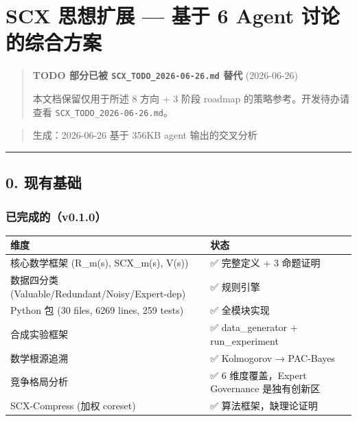 \documentclass[
  12pt,
]{ctexart}
\author{SCX}
\date{2026}
\begin{document}
\section{SCX 思想扩展 --- 基于 6 Agent
讨论的综合方案}\label{scx-ux601dux60f3ux6269ux5c55-ux57faux4e8e-6-agent-ux8ba8ux8bbaux7684ux7efcux5408ux65b9ux6848}

\begin{quote}
\textbf{TODO 部分已被 \texttt{SCX\_TODO\_2026-06-26.md} 替代}
(2026-06-26)

本文档保留仅用于所述 8 方向 + 3 阶段 roadmap 的策略参考。开发待办请查看
\texttt{SCX\_TODO\_2026-06-26.md}。
\end{quote}

\begin{quote}
生成：2026-06-26 \textbar{} 基于 356KB agent 输出的交叉分析
\end{quote}

\begin{center}\rule{0.5\linewidth}{0.5pt}\end{center}

\subsection{0. 现有基础}\label{ux73b0ux6709ux57faux7840}

\subsubsection{已完成的（v0.1.0）}\label{ux5df2ux5b8cux6210ux7684v0.1.0}

\begin{longtable}[]{@{}ll@{}}
\toprule\noalign{}
维度 & 状态 \\
\midrule\noalign{}
\endhead
\bottomrule\noalign{}
\endlastfoot
核心数学框架 (R\_m(s), SCX\_m(s), V(s)) & ✅ 完整定义 + 3 命题证明 \\
数据四分类 (Valuable/Redundant/Noisy/Expert-dep) & ✅ 规则引擎 \\
Python 包 (30 files, 6269 lines, 259 tests) & ✅ 全模块实现 \\
合成实验框架 & ✅ data\_generator + run\_experiment \\
数学根源追溯 & ✅ Kolmogorov → PAC-Bayes \\
竞争格局分析 & ✅ 6 维度覆盖，Expert Governance 是独有创新区 \\
SCX-Compress (加权 coreset) & ✅ 算法框架，缺理论证明 \\
\end{longtable}
\end{document}
